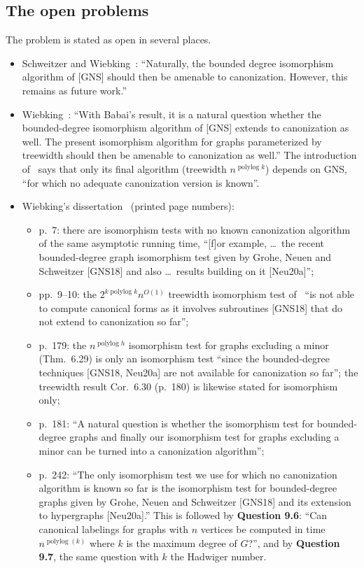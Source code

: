 \documentclass[11pt]{article}
\theoremstyle{plain}
\theoremstyle{definition}
\theoremstyle{remark}
\theoremstyle{named}
\theoremstyle{namedrm}
\newcommand{\polylog}{\operatorname{polylog}}
\begin{document}
\subsection{The open problems}\label{sec:open}

The problem is stated as open in several places.
\begin{itemize}
\item Schweitzer and Wiebking~\cite[Outlook]{SW19}: ``Naturally, the bounded degree isomorphism
  algorithm of [GNS] should then be amenable to canonization. However, this remains as future work.''
\item Wiebking~\cite[Outlook]{Wie20}: ``With Babai's result, it is a natural question whether the
  bounded-degree isomorphism algorithm of [GNS] extends to canonization as well. The present
  isomorphism algorithm for graphs parameterized by treewidth should then be amenable to
  canonization as well.'' The introduction of~\cite{Wie20} says that only its final algorithm (treewidth
  $n^{\polylog k}$) depends on GNS, ``for which no adequate canonization version is known''.
\item Wiebking's dissertation~\cite{Wie21} (printed page numbers):
  \begin{itemize}
  \item p.~7: there are isomorphism tests with no known canonization algorithm of the same
    asymptotic running time, ``[f]or example, \dots\ the recent bounded-degree graph isomorphism test
    given by Grohe, Neuen and Schweitzer [GNS18] and also \dots\ results building on it [Neu20a]'';
  \item pp.~9--10: the $2^{k\polylog k}n^{O(1)}$ treewidth isomorphism test of~\cite{GNSW} ``is not
    able to compute canonical forms as it involves subroutines [GNS18] that do not extend to
    canonization so far'';
  \item p.~179: the $n^{\polylog h}$ isomorphism test for graphs excluding a minor (Thm.~6.29) is
    only an isomorphism test ``since the bounded-degree techniques [GNS18, Neu20a] are not available
    for canonization so far''; the treewidth result Cor.~6.30 (p.~180) is likewise stated for
    isomorphism only;
  \item p.~181: ``A natural question is whether the isomorphism test for bounded-degree graphs and
    finally our isomorphism test for graphs excluding a minor can be turned into a canonization
    algorithm'';
  \item p.~242: ``The only isomorphism test we use for which no canonization algorithm is known so far
    is the isomorphism test for bounded-degree graphs given by Grohe, Neuen and Schweitzer [GNS18] and
    its extension to hypergraphs [Neu20a].'' This is followed by
    \textbf{Question 9.6}: ``Can canonical labelings for graphs with $n$ vertices be computed in time
    $n^{\polylog(k)}$ where $k$ is the maximum degree of $G$?'', and by \textbf{Question 9.7}, the same
    question with $k$ the Hadwiger number.
  \end{itemize}
\end{itemize}
\end{document}
